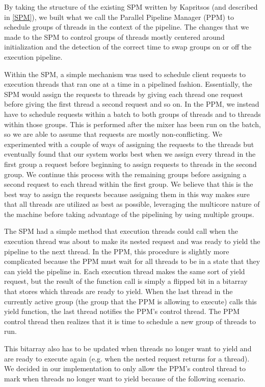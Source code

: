 \documentclass[11pt, oneside]{report}
\begin{document}
By taking the structure of the existing SPM written by Kapritsos (and described in \ref{SPM}), we built what we call the Parallel Pipeline Manager (PPM) to schedule groups of threads in the context of the pipeline. 
The changes that we made to the SPM to control groups of threads mostly centered around initialization and the detection of the correct time to swap groups on or off the execution pipeline.

Within the SPM, a simple mechanism was used to schedule client requests to execution threads that ran one at a time in a pipelined fashion. 
Essentially, the SPM would assign the requests to threads by giving each thread one request before giving the first thread a second request and so on. 
In the PPM, we instead have to schedule requests within a batch to both groups of threads and to threads within those groups. 
This is performed after the mixer has been run on the batch, so we are able to assume that requests are mostly non-conflicting. 
We experimented with a couple of ways of assigning the requests to the threads but eventually found that our system works best when we assign every thread in the first group a request before beginning to assign requests to threads in the second group.
We continue this process with the remaining groups before assigning a second request to each thread within the first group. 
We believe that this is the best way to assign the requests because assigning them in this way makes sure that all threads are utilized as best as possible, leveraging the multicore nature of the machine before taking advantage of the pipelining by using multiple groups.

The SPM had a simple method that execution threads could call when the execution thread was about to make its nested request and was ready to yield the pipeline to the next thread. 
In the PPM, this procedure is slightly more complicated because the PPM must wait for all threads to be in a state that they can yield the pipeline in. 
Each execution thread makes the same sort of yield request, but the result of the function call is simply a flipped bit in a bitarray that stores which threads are ready to yield. 
When the last thread in the currently active group (the group that the PPM is allowing to execute) calls this yield function, the last thread notifies the PPM's control thread.
The PPM control thread then realizes that it is time to schedule a new group of threads to run. 

This bitarray also has to be updated when threads no longer want to yield and are ready to execute again (e.g. when the nested request returns for a thread). 
We decided in our implementation to only allow the PPM's control thread to mark when threads no longer want to yield because of the following scenario. 
\end{document}
